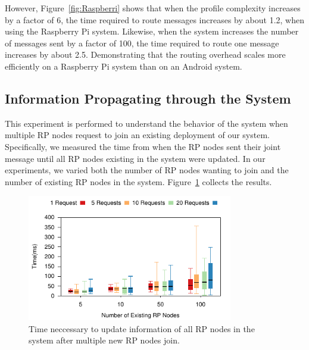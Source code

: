 However, Figure~\ref{fig:Raspberri} shows that when the profile complexity increases by a factor of 6, the time required to route messages increases by about 1.2, when using the Raspberry Pi system. Likewise, when the system increases the number of messages sent by a factor of 100, the time required to route one message increases by about 2.5. Demonstrating that the routing overhead scales more efficiently on a Raspberry Pi system than on an Android system.

\subsection{Information Propagating through the System}

This experiment is performed to understand the behavior of the system when multiple RP nodes request to join an existing deployment of our system. Specifically, we measured the time from when the RP nodes sent their joint message until all RP nodes existing in the system were updated. In our experiments, we varied both the number of RP nodes wanting to join and the number of existing RP nodes in the system. Figure~\ref{fig:rpDiscovery} collects the results.

\begin{figure}[htb!]
  \centering
    \includegraphics[width=0.8\textwidth]{Figures/rpDiscoveryBox.pdf}
  \caption{Time neccessary to update information of all RP nodes in the system after multiple new RP nodes join.} \label{fig:rpDiscovery}
\end{figure}

